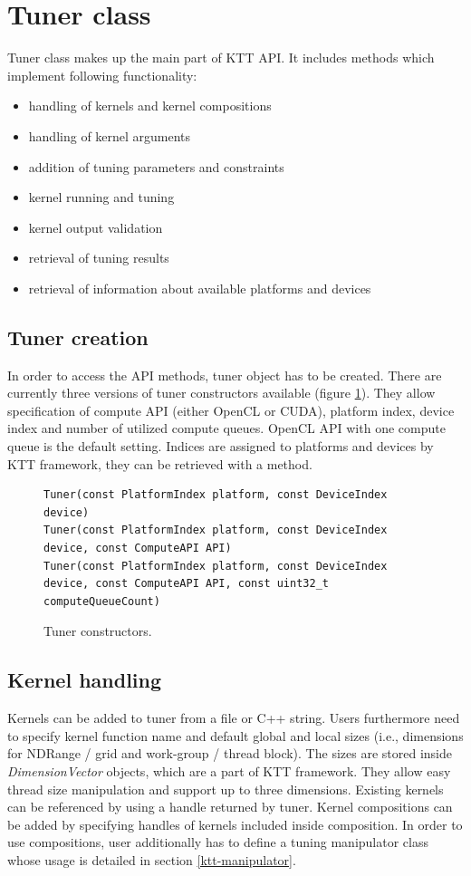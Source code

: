 \documentclass
[
    digital, %
    oneside, %
    table, %
    nolof, %
    nolot, %
    nocover %
]{fithesis3}
\begin{document}
\section{Tuner class}
Tuner class makes up the main part of KTT API. It includes methods which implement following functionality:
\begin{itemize}
    \item handling of kernels and kernel compositions
    \item handling of kernel arguments
    \item addition of tuning parameters and constraints
    \item kernel running and tuning
    \item kernel output validation
    \item retrieval of tuning results
    \item retrieval of information about available platforms and devices
\end{itemize}

\subsection{Tuner creation}
In order to access the API methods, tuner object has to be created. There are currently three versions of tuner constructors available (figure 
\ref{ktt-constructors}). They allow specification of compute API (either OpenCL or CUDA), platform index, device index and number of utilized compute
queues. OpenCL API with one compute queue is the default setting. Indices are assigned to platforms and devices by KTT framework, they can be retrieved
with a method.

\begin{figure}
\begin{adjustwidth}{-1cm}{-1cm}
\begin{lstlisting}
Tuner(const PlatformIndex platform, const DeviceIndex device)
Tuner(const PlatformIndex platform, const DeviceIndex device, const ComputeAPI API)
Tuner(const PlatformIndex platform, const DeviceIndex device, const ComputeAPI API, const uint32_t computeQueueCount)
\end{lstlisting}
\caption{Tuner constructors.}
\label{ktt-constructors}
\end{adjustwidth}
\end{figure}

\subsection{Kernel handling}
Kernels can be added to tuner from a file or C++ string. Users furthermore need to specify kernel function name and default global and local sizes
(i.e., dimensions for NDRange / grid and work-group / thread block). The sizes are stored inside \textit{DimensionVector} objects, which are a part of
KTT framework. They allow easy thread size manipulation and support up to three dimensions. Existing kernels can be referenced by using a handle returned
by tuner. Kernel compositions can be added by specifying handles of kernels included inside composition. In order to use compositions, user additionally
has to define a tuning manipulator class whose usage is detailed in section \ref{ktt-manipulator}.
\end{document}
